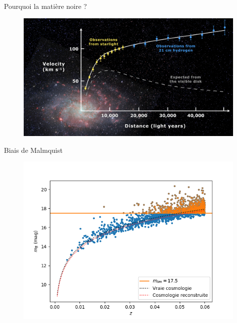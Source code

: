 \documentclass{beamer}
\begin{document}
\appendix

\begin{frame}{Pourquoi la matière noire ?}
	\begin{figure}
		\centering
		\includegraphics[width=.8\textwidth]{figures/Rotation_curve_galaxy}
	\end{figure}
\end{frame}

\begin{frame}{Biais de Malmquist}
\begin{figure}
	\includegraphics[height=0.9\textheight]{figures/Malmquist.png}
\end{figure}
\end{frame}
\end{document}
